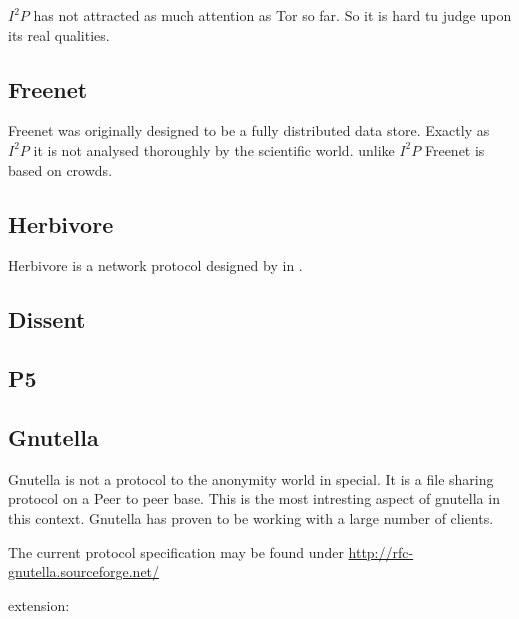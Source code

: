 $I^2P$ has not attracted as much attention as Tor so far. So it is hard tu judge upon its real qualities.



\subsection{Freenet}
Freenet was originally designed to be a fully distributed data store\cite{freenet}. Exactly as $I^2P$ it is not analysed thoroughly by the scientific world. unlike $I^2P$ Freenet is based on crowds.



\subsection{Herbivore}
Herbivore is a network protocol designed by \citeauthor{herbivore:tr} in \cite{herbivore:tr}.


\subsection{Dissent}
\cite{Corrigan-Gibbs:2010:DAA:1866307.1866346}


\subsection{P5}
\cite{sherwood-protocol}


\subsection{Gnutella}
Gnutella is not a protocol to the anonymity world in special. It is a file sharing protocol on a Peer to peer base. This is the most intresting aspect of gnutella in this context. Gnutella has proven to be working with a large number of clients.

The current protocol specification may be found under \href{http://rfc-gnutella.sourceforge.net/developer/stable/index.html}{http://rfc-gnutella.sourceforge.net/}

extension: \cite{AthanRAM07}

